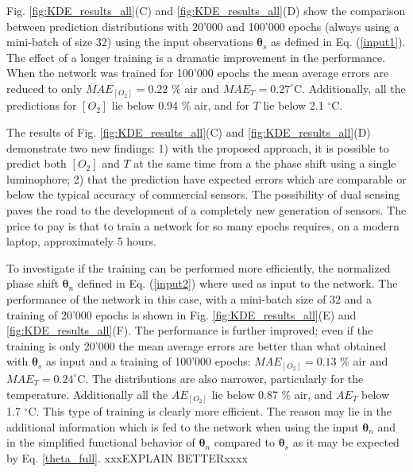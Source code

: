 \documentclass[9pt,twocolumn,twoside,pdftex]{optica}
\begin{document}
Fig. \ref{fig:KDE_results_all}(C) and \ref{fig:KDE_results_all}(D) show the comparison between prediction distributions with 20'000 and 100'000 epochs (always using a mini-batch of size 32) using the input observations ${\pmb \theta}_s$ as defined in Eq. (\ref{input1}). The effect of a longer training is a dramatic improvement in the performance. When the network was trained for 100'000 epochs the mean average errors are reduced to only $MAE_{[O_2]}=0.22$ \% air and $MAE_{T}=0.27^\circ$C. Additionally, all the predictions for $[O_2]$ lie below 0.94 \% air, and for $T$ lie below 2.1 $^\circ$C.

The results of Fig. \ref{fig:KDE_results_all}(C) and \ref{fig:KDE_results_all}(D) demonstrate two new findings: 1) with the proposed approach, it is possible to predict both $[O_2]$ and $T$ at the same time from a the phase shift using a single luminophore; 2) that the prediction have expected errors which are comparable or below the typical accuracy of commercial sensors. The possibility of dual sensing paves the road to the development of a completely new generation of sensors.
The price to pay is that to train a network for so many epochs requires, on a modern laptop, approximately 5 hours.

To investigate if the training can be performed more efficiently, the normalized phase shift ${\pmb \theta}_n$ defined in Eq. (\ref{input2}) where used as input to the network. The performance of the network in this case, with a mini-batch size of 32 and a training of 20'000 epochs is shown in Fig. \ref{fig:KDE_results_all}(E) and \ref{fig:KDE_results_all}(F). The performance is further improved; even if the training is only 20'000 the mean average errors are better than what obtained with ${\pmb \theta}_s$ as input and a training of 100'000 epochs: $MAE_{[O_2]}=0.13$ \% air and $MAE_{T}=0.24^\circ$C. The distributions are also narrower, particularly for the temperature. Additionally all the $AE_{[O_2]}$ lie below 0.87 \% air, and  $AE_{T}$ below 1.7 $^\circ$C. This type of training is clearly more efficient. The reason may lie in the additional information which is fed to the network when using the input ${\pmb \theta}_n$ and in the simplified functional behavior of ${\pmb \theta}_n$ compared to ${\pmb \theta}_s$ as it may be expected by Eq. \ref{theta_full}. xxxEXPLAIN BETTERxxxx
\end{document}
